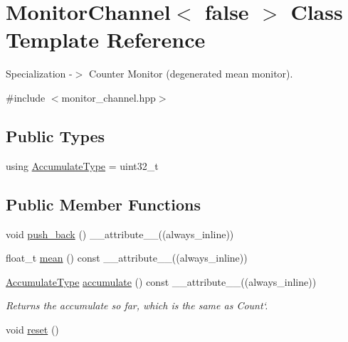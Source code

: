 \hypertarget{classMonitorChannel_3_01false_01_4}{}\section{Monitor\+Channel$<$ false $>$ Class Template Reference}
\label{classMonitorChannel_3_01false_01_4}


Specialization -\/$>$ Counter Monitor (degenerated mean monitor).  




{\ttfamily \#include $<$monitor\+\_\+channel.\+hpp$>$}

\subsection*{Public Types}
\begin{DoxyCompactItemize}
\item 
using \hyperlink{classMonitorChannel_3_01false_01_4_a72d6a503399e9e8e986f0258d508a1b2}{Accumulate\+Type} = uint32\+\_\+t
\end{DoxyCompactItemize}
\subsection*{Public Member Functions}
\begin{DoxyCompactItemize}
\item 
void \hyperlink{classMonitorChannel_3_01false_01_4_aec5ccac7dbda7816b5ddc163d6d4aa5b}{push\+\_\+back} () \+\_\+\+\_\+attribute\+\_\+\+\_\+((always\+\_\+inline))
\item 
float\+\_\+t \hyperlink{classMonitorChannel_3_01false_01_4_aff1c900b36c53bd674b53f94c3c2770b}{mean} () const \+\_\+\+\_\+attribute\+\_\+\+\_\+((always\+\_\+inline))
\item 
\hyperlink{classMonitorChannel_3_01false_01_4_a72d6a503399e9e8e986f0258d508a1b2}{Accumulate\+Type} \hyperlink{classMonitorChannel_3_01false_01_4_a55677fe669bca6b9382fc3baa73162b9}{accumulate} () const \+\_\+\+\_\+attribute\+\_\+\+\_\+((always\+\_\+inline))
\begin{DoxyCompactList}\small\item\em Returns the accumulate so far, which is the same as \textquotesingle{}Count`. \end{DoxyCompactList}\item 
void \hyperlink{classMonitorChannel_3_01false_01_4_a9310343e280b593894ac370932be4cbe}{reset} ()
\end{DoxyCompactItemize}
